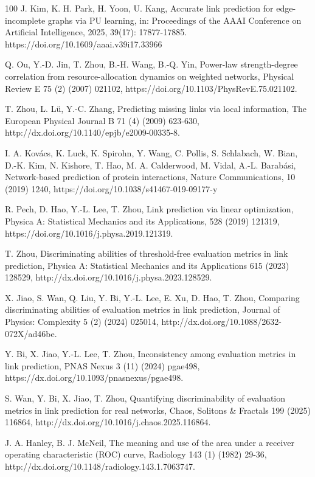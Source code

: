 \documentclass{article}
\begin{document}
\begin{thebibliography}{100}
	J. Kim, K. H. Park, H. Yoon, U. Kang, Accurate link prediction for edge-incomplete graphs via PU learning, in: Proceedings of the AAAI Conference on Artificial Intelligence, 2025, 39(17): 17877-17885. https://doi.org/10.1609/aaai.v39i17.33966 
	
	Q. Ou, Y.-D. Jin, T. Zhou, B.-H. Wang, B.-Q. Yin, Power-law strength-degree correlation from resource-allocation dynamics on weighted networks, Physical Review E 75 (2) (2007) 021102, https://doi.org/10.1103/PhysRevE.75.021102.
	
	T. Zhou, L. Lü, Y.-C. Zhang, Predicting missing links via local information, The European Physical Journal B 71 (4) (2009) 623-630, http://dx.doi.org/10.1140/epjb/e2009-00335-8.
	
	I. A. Kovács, K. Luck, K. Spirohn, Y. Wang, C. Pollis, S. Schlabach, W. Bian, D.-K. Kim, N. Kishore, T. Hao, M. A. Calderwood, M. Vidal, A.-L. Barabási, Network-based prediction of protein interactions, Nature Communications, 10 (2019) 1240, https://doi.org/10.1038/s41467-019-09177-y
	
	R. Pech, D. Hao, Y.-L. Lee, T. Zhou, Link prediction via linear optimization, Physica A: Statistical Mechanics and its Applications, 528 (2019) 121319, https://doi.org/10.1016/j.physa.2019.121319.
	
	T. Zhou, Discriminating abilities of threshold-free evaluation metrics in link prediction, Physica A: Statistical Mechanics and its Applications 615 (2023) 128529, http://dx.doi.org/10.1016/j.physa.2023.128529.
	
	X. Jiao, S. Wan, Q. Liu, Y. Bi, Y.-L. Lee, E. Xu, D. Hao, T. Zhou, Comparing discriminating abilities of evaluation metrics in link prediction, Journal of Physics: Complexity 5 (2) (2024) 025014, http://dx.doi.org/10.1088/2632-072X/ad46be.
	
	Y. Bi, X. Jiao, Y.-L. Lee, T. Zhou, Inconsistency among evaluation metrics in link prediction, PNAS Nexus 3 (11) (2024) pgae498, https://dx.doi.org/10.1093/pnasnexus/pgae498.
	
	S. Wan, Y. Bi, X. Jiao, T. Zhou, Quantifying discriminability of evaluation metrics in link prediction for real networks, Chaos, Solitons \& Fractals 199 (2025) 116864, http://dx.doi.org/10.1016/j.chaos.2025.116864.
	
	J. A. Hanley, B. J. McNeil, The meaning and use of the area under a receiver operating characteristic (ROC) curve, Radiology 143 (1) (1982) 29-36, http://dx.doi.org/10.1148/radiology.143.1.7063747.
	

\end{thebibliography}
\end{document}
